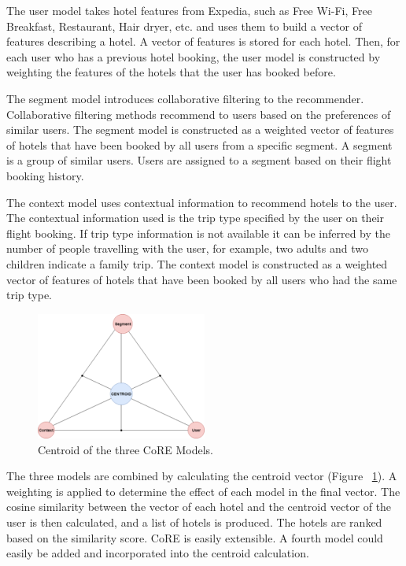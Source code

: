 The user model takes hotel features from Expedia, such as Free Wi-Fi, Free Breakfast, Restaurant, Hair dryer, etc. and uses them to build a vector of features describing a hotel. A vector of features is stored for each hotel. Then, for each user who has a previous hotel booking, the user model is constructed by weighting the features of the hotels that the user has booked before.

The segment model introduces collaborative filtering to the recommender. Collaborative filtering methods recommend to users based on the preferences of similar users. The segment model is constructed as a weighted vector of features of hotels that have been booked by all users from a specific segment. A segment is a group of similar users. Users are assigned to a segment based on their flight booking history.

The context model uses contextual information to recommend hotels to the user. The contextual information used is the trip type specified by the user on their flight booking. If trip type information is not available it can be inferred by the number of people travelling with the user, for example, two adults and two children indicate a family trip. The context model is constructed as a weighted vector of features of hotels that have been booked by all users who had the same trip type.

\begin{figure}[h!]
\centering
\includegraphics[width=0.5\textwidth]{design_and_methodology/centroid.png}
\caption{\label{fig:centroid} Centroid of the three CoRE Models.}
\end{figure}

The three models are combined by calculating the centroid vector (Figure ~\ref{fig:centroid}). A weighting is applied to determine the effect of each model in the final vector. The cosine similarity between the vector of each hotel and the centroid vector of the user is then calculated, and a list of hotels is produced. The hotels are ranked based on the similarity score. CoRE is easily extensible. A fourth model could easily be added and incorporated into the centroid calculation.

